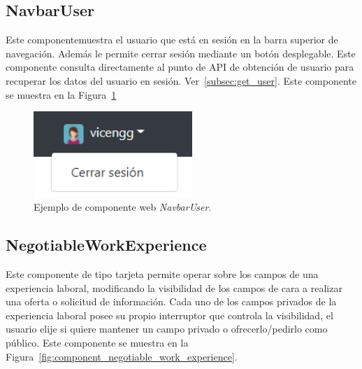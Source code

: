 \documentclass[a4paper, 12pt]{book}
\begin{document}
    \subsection{NavbarUser}
    \label{subsec:wc_navbar_user}
    Este componentemuestra el usuario que está en sesión en la barra superior de navegación.
    Además le permite cerrar sesión mediante un botón desplegable.
    Este componente consulta directamente al punto de API de obtención de usuario para recuperar los datos del usuario en sesión. Ver~\ref{subsec:get_user}.
    Este componente se muestra en la Figura~\ref{fig:component_navbar_user}

    \begin{figure}
        \centering
        \includegraphics[width=6cm, keepaspectratio]{img/NavbarUser.PNG}
        \caption{Ejemplo de componente web \emph{NavbarUser}.}\label{fig:component_navbar_user}
    \end{figure}

    \subsection{NegotiableWorkExperience}
    \label{subsec:wc_negotiable_work_experience}
    Este componente de tipo tarjeta permite operar sobre los campos de una experiencia laboral, modificando la visibilidad de los campos de cara a realizar una oferta o solicitud de información.
    Cada uno de los campos privados de la experiencia laboral posee su propio interruptor que controla la visibilidad, el usuario elije si quiere mantener un campo privado o ofrecerlo/pedirlo como público.
    Este componente se muestra en la Figura~\ref{fig:component_negotiable_work_experience}.
\end{document}
